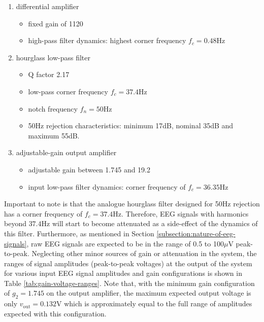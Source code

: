 \begin{enumerate}[label=(\alph*)] %
\item differential amplifier
\begin{itemize}
    \item fixed gain of 1120
    \item high-pass filter dynamics: highest corner frequency $f_c=0.48$Hz
\end{itemize}
\item hourglass low-pass filter
\begin{itemize}
    \item Q factor 2.17
    \item low-pass corner frequency $f_c=37.4$Hz
    \item notch frequency $f_n=50$Hz
    \item 50Hz rejection characteristics: minimum 17dB, nominal 35dB and maximum 55dB.
\end{itemize}

\item adjustable-gain output amplifier
\begin{itemize}
    \item adjustable gain between 1.745 and 19.2
    \item input low-pass filter dynamics: corner frequency of $f_c=36.35$Hz 
\end{itemize}
\end{enumerate}
Important to note is that the analogue hourglass filter designed for 50Hz rejection has a corner frequency of $f_c=37.4$Hz. Therefore, EEG signals with harmonics beyond $37.4$Hz will start to become attenuated as a side-effect of the dynamics of this filter. Furthermore, as mentioned in Section \ref{subsection:nature-of-eeg-signals}, raw EEG signals are expected to be in the range of 0.5 to 100$\mu$V peak-to-peak. Neglecting other minor sources of gain or attenuation in the system, the ranges of signal amplitudes (peak-to-peak voltages) at the output of the system for various input EEG signal amplitudes and gain configurations is shown in Table \ref{tab:gain-voltage-ranges}. Note that, with the minimum gain configuration of $g_2=1.745$ on the output amplifier, the maximum expected output voltage is only $v_{\textrm{out}}=0.132$V which is approximately equal to the full range of amplitudes expected with this configuration.

